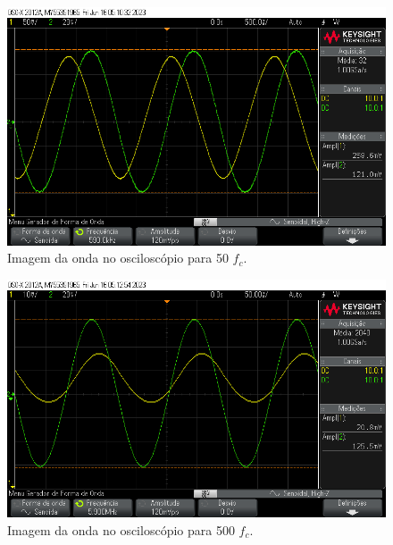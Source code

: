 \begin{figure}[h]
    \centering
    \includegraphics[width=1\columnwidth]{images/exemplo2_50_fc.png}
    \caption{Imagem da onda no osciloscópio para 50 $f_c$.}
\end{figure}


\begin{figure}[h]
    \centering
    \includegraphics[width=1\columnwidth]{images/exemplo2_500_fc.png}
    \caption{Imagem da onda no osciloscópio para 500 $f_c$.}
\end{figure}


\newpage
